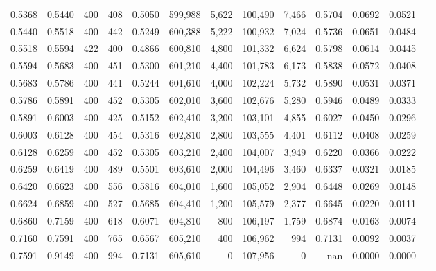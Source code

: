 \begin{tabular}{rrrrrrrrrrrrr}
0.5368 & 0.5440 &    400 & 408 &                                     0.5050 & 599,988 &   5,622 & 100,490 &   7,466 & 0.5704 & 0.0692 & 0.0521 \\
0.5440 & 0.5518 &    400 & 442 &                                     0.5249 & 600,388 &   5,222 & 100,932 &   7,024 & 0.5736 & 0.0651 & 0.0484 \\
0.5518 & 0.5594 &    422 & 400 &                                     0.4866 & 600,810 &   4,800 & 101,332 &   6,624 & 0.5798 & 0.0614 & 0.0445 \\
0.5594 & 0.5683 &    400 & 451 &                                     0.5300 & 601,210 &   4,400 & 101,783 &   6,173 & 0.5838 & 0.0572 & 0.0408 \\
0.5683 & 0.5786 &    400 & 441 &                                     0.5244 & 601,610 &   4,000 & 102,224 &   5,732 & 0.5890 & 0.0531 & 0.0371 \\
0.5786 & 0.5891 &    400 & 452 &                                     0.5305 & 602,010 &   3,600 & 102,676 &   5,280 & 0.5946 & 0.0489 & 0.0333 \\
0.5891 & 0.6003 &    400 & 425 &                                     0.5152 & 602,410 &   3,200 & 103,101 &   4,855 & 0.6027 & 0.0450 & 0.0296 \\
0.6003 & 0.6128 &    400 & 454 &                                     0.5316 & 602,810 &   2,800 & 103,555 &   4,401 & 0.6112 & 0.0408 & 0.0259 \\
0.6128 & 0.6259 &    400 & 452 &                                     0.5305 & 603,210 &   2,400 & 104,007 &   3,949 & 0.6220 & 0.0366 & 0.0222 \\
0.6259 & 0.6419 &    400 & 489 &                                     0.5501 & 603,610 &   2,000 & 104,496 &   3,460 & 0.6337 & 0.0321 & 0.0185 \\
0.6420 & 0.6623 &    400 & 556 &                                     0.5816 & 604,010 &   1,600 & 105,052 &   2,904 & 0.6448 & 0.0269 & 0.0148 \\
0.6624 & 0.6859 &    400 & 527 &                                     0.5685 & 604,410 &   1,200 & 105,579 &   2,377 & 0.6645 & 0.0220 & 0.0111 \\
0.6860 & 0.7159 &    400 & 618 &                                     0.6071 & 604,810 &     800 & 106,197 &   1,759 & 0.6874 & 0.0163 & 0.0074 \\
0.7160 & 0.7591 &    400 & 765 &                                     0.6567 & 605,210 &     400 & 106,962 &     994 & 0.7131 & 0.0092 & 0.0037 \\
0.7591 & 0.9149 &    400 & 994 &                                     0.7131 & 605,610 &       0 & 107,956 &       0 &    nan & 0.0000 & 0.0000 \\
\bottomrule
\end{tabular}
